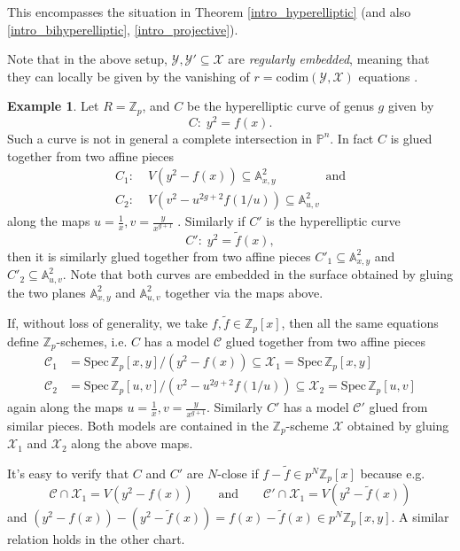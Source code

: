 \documentclass{article}
\theoremstyle{definition}
\newtheorem{example}[defn]{Example}
\theoremstyle{plain}
\theoremstyle{remark}
\newcommand{\spec}{\mathrm{Spec}\,}
\newcommand{\codim}{\mathrm{codim}}
\begin{document}
	This encompasses the situation in Theorem \ref{intro_hyperelliptic} (and also \ref{intro_bihyperelliptic}, \ref{intro_projective}).
	
	Note that in the above setup, $\mathcal{Y},\mathcal{Y}'\subseteq \mathcal{X}$ are \emph{regularly embedded}, meaning that they can locally be given by the vanishing of $r = \codim(\mathcal{Y}, \mathcal{X})$ equations \cite[Definition 6.3.4]{liu2002algebraic}.
	\begin{example}\label{2_hyperell_example}
		Let $R = \mathbb{Z}_p$, and $C$ be the hyperelliptic curve of genus $g$ given by
		\[C:\;y^2 = f(x).\]
		Such a curve is not in general a complete intersection in $\mathbb{P}^n$. In fact $C$ is glued together from two affine pieces
		\begin{align*}
			C_1:\; &V(y^2 - f(x))\subseteq \mathbb{A}^2_{x,y}\qquad\qquad\text{and}\\
			C_2:\; &V(v^2 - u^{2g+2}f(1/u)) \subseteq \mathbb{A}^2_{u,v}
		\end{align*}
		along the maps $u = \frac{1}{x}, v = \frac{y}{x^{g+1}}$ . Similarly if $C'$ is the hyperelliptic curve
		\[C':\;y^2 = \widetilde{f}(x),\]
		then it is similarly glued together from two affine pieces $C'_1\subseteq \mathbb{A}^2_{x,y}$ and $C'_2\subseteq \mathbb{A}^2_{u,v}$. Note that both curves are embedded in the surface obtained by gluing the two planes $\mathbb{A}^2_{x,y}$ and $\mathbb{A}^2_{u,v}$ together via the maps above.
		
		If, without loss of generality, we take $f, \widetilde{f}\in \mathbb{Z}_p[x]$, then all the same equations define $\mathbb{Z}_p$-schemes, i.e. $C$ has a model $\mathcal{C}$ glued together from two affine pieces
		\begin{align*}
			\mathcal{C}_1 &= \spec \mathbb{Z}_p[x,y]/(y^2-f(x)) \subseteq \mathcal{X}_1 = \spec \mathbb{Z}_p[x,y]\\
			\mathcal{C}_2 &= \spec \mathbb{Z}_p[u,v]/(v^2-u^{2g+2}f(1/u)) \subseteq \mathcal{X}_2 = \spec \mathbb{Z}_p[u,v]
		\end{align*}
		again along the maps $u = \frac{1}{x}, v = \frac{y}{x^{g+1}}$. Similarly $C'$ has a model $\mathcal{C}'$ glued from similar pieces. Both models are contained in the $\mathbb{Z}_p$-scheme $\mathcal{X}$ obtained by gluing $\mathcal{X}_1$ and $\mathcal{X}_2$ along the above maps.
		
		It's easy to verify that $C$ and $C'$ are $N$-close if $f-\widetilde{f}\in p^N\mathbb{Z}_p[x]$ because e.g.
		\[\mathcal{C}\cap \mathcal{X}_1 = V(y^2-f(x))\qquad\text{and}\qquad \mathcal{C}'\cap \mathcal{X}_1 = V(y^2 - \widetilde{f}(x))\]
		and $(y^2-f(x))-(y^2-\widetilde{f}(x)) = f(x) - \widetilde{f}(x)\in p^N\mathbb{Z}_p[x, y]$. A similar relation holds in the other chart.
	\end{example}
	
\end{document}

